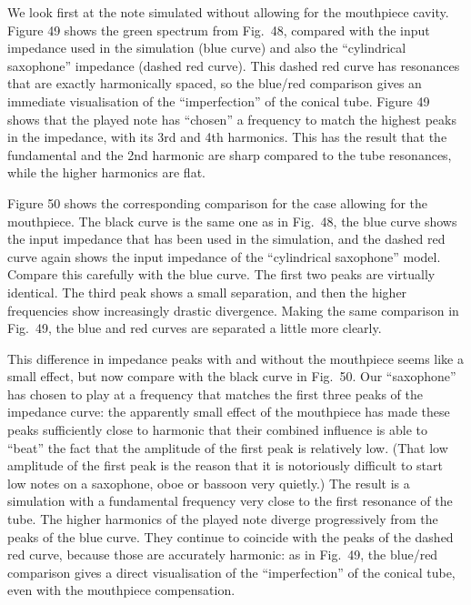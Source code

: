   We look first at the note simulated without allowing for the mouthpiece 
  cavity. Figure 49 shows the green spectrum from Fig.\ 48, compared with the 
  input impedance used in the simulation (blue curve) and also the 
  ``cylindrical saxophone'' impedance (dashed red curve). This dashed red curve 
  has resonances that are exactly harmonically spaced, so the blue/red 
  comparison gives an immediate visualisation of the “imperfection” of the 
  conical tube. Figure 49 shows that the played note has ``chosen'' a frequency 
  to match the highest peaks in the impedance, with its 3rd and 4th harmonics. 
  This has the result that the fundamental and the 2nd harmonic are sharp 
  compared to the tube resonances, while the higher harmonics are flat. 

  Figure 50 shows the corresponding comparison for the case allowing for the 
  mouthpiece. The black curve is the same one as in Fig.\ 48, the blue curve 
  shows the input impedance that has been used in the simulation, and the 
  dashed red curve again shows the input impedance of the “cylindrical 
  saxophone” model. Compare this carefully with the blue curve. The first two 
  peaks are virtually identical. The third peak shows a small separation, and 
  then the higher frequencies show increasingly drastic divergence. Making the 
  same comparison in Fig.\ 49, the blue and red curves are separated a little 
  more clearly. 

  This difference in impedance peaks with and without the mouthpiece seems like 
  a small effect, but now compare with the black curve in Fig.\ 50. Our 
  “saxophone” has chosen to play at a frequency that matches the first three 
  peaks of the impedance curve: the apparently small effect of the mouthpiece 
  has made these peaks sufficiently close to harmonic that their combined 
  influence is able to ``beat'' the fact that the amplitude of the first peak 
  is relatively low. (That low amplitude of the first peak is the reason that 
  it is notoriously difficult to start low notes on a saxophone, oboe or 
  bassoon very quietly.) The result is a simulation with a fundamental 
  frequency very close to the first resonance of the tube. The higher harmonics 
  of the played note diverge progressively from the peaks of the blue curve. 
  They continue to coincide with the peaks of the dashed red curve, because 
  those are accurately harmonic: as in Fig.\ 49, the blue/red comparison gives 
  a direct visualisation of the “imperfection” of the conical tube, even with 
  the mouthpiece compensation. 



